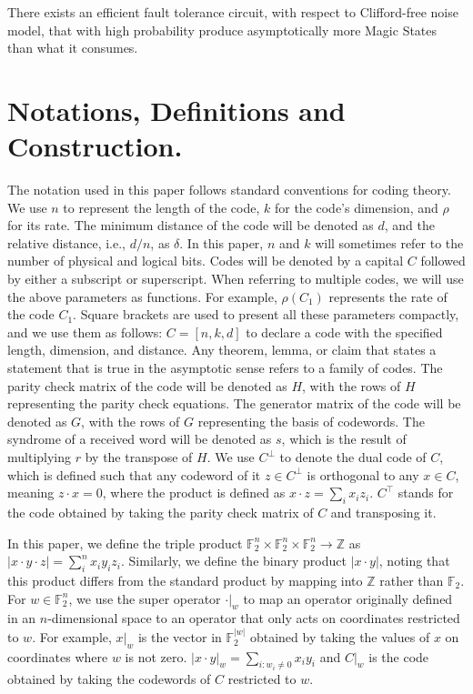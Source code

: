 \begin{theorem}
  There exists an efficient fault tolerance circuit, with respect to Clifford-free noise model, that with high probability produce asymptotically more Magic States than what it consumes.
\end{theorem}
\section{Notations, Definitions and Construction.} The notation used in this paper follows standard conventions for coding theory. We use $n$ to represent the length of the code, $k$ for the code's dimension, and $\rho$ for its rate. The minimum distance of the code will be denoted as $d$, and the relative distance, i.e., $d/n$, as $\delta$. In this paper, $n$ and $k$ will sometimes refer to the number of physical and logical bits. Codes will be denoted by a capital $C$ followed by either a subscript or superscript. When referring to multiple codes, we will use the above parameters as functions. For example, $\rho(C_{1})$ represents the rate of the code $C_{1}$. Square brackets are used to present all these parameters compactly, and we use them as follows: $C=[n,k,d]$ to declare a code with the specified length, dimension, and distance. Any theorem, lemma, or claim that states a statement that is true in the asymptotic sense refers to a family of codes. The parity check matrix of the code will be denoted as $H$, with the rows of $H$ representing the parity check equations. The generator matrix of the code will be denoted as $G$, with the rows of $G$ representing the basis of codewords. The syndrome of a received word will be denoted as $s$, which is the result of multiplying $r$ by the transpose of $H$. We use $C^\perp$ to denote the dual code of $C$, which is defined such that any codeword of it $z\in C^\perp$ is orthogonal to any $x\in C$, meaning $z\cdot x = 0$, where the product is defined as $x\cdot z = \sum_{i}{x_{i}z_{i}}$. $C^{\top}$ stands for the code obtained by taking the parity check matrix of $C$ and transposing it.

In this paper, we define the triple product $\mathbb{F}_2^{n}\times \mathbb{F}_2^{n}\times\mathbb{F}_2^{n} \rightarrow \mathbb{Z}$ as $|x\cdot y \cdot z| = \sum_{i}^{n}{x_{i}y_{i}z_{i}}$. Similarly, we define the binary product $|x \cdot y|$, noting that this product differs from the standard product by mapping into $\mathbb{Z}$ rather than $\mathbb{F}_{2}$. For $w \in \mathbb{F}_{2}^{n}$, we use the super operator $ \cdot |_{w} $ to map an operator originally defined in an $n$-dimensional space to an operator that only acts on coordinates restricted to $w$. For example, $x|_{w}$ is the vector in $\mathbb{F}_{2}^{|w|}$ obtained by taking the values of $x$ on coordinates where $w$ is not zero. $|x\cdot y|_{w} = \sum_{i:w_{i}\neq 0}{x_{i}y_{i}}$ and $C|_{w}$ is the code obtained by taking the codewords of $C$ restricted to $w$.

